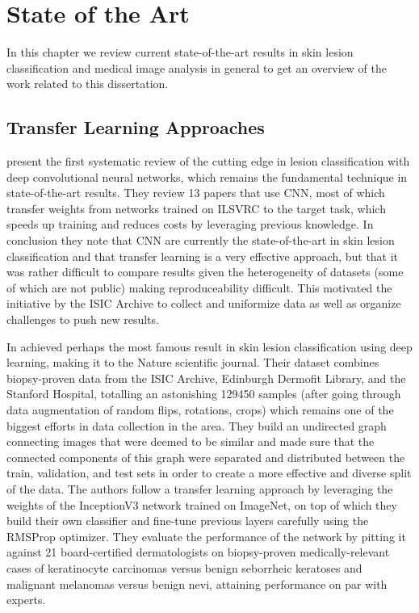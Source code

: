 \chapter{State of the Art}
\label{chapter:sota}

In this chapter we review current state-of-the-art results in skin lesion classification and medical image analysis in general to get an overview of the work related to this dissertation.

\section{Transfer Learning Approaches}

\citeauthor{Brinker2018} \cite{Brinker2018} present the first systematic review of the cutting edge in lesion classification with deep convolutional neural networks, which remains the fundamental technique in state-of-the-art results. They review 13 papers that use \ac{CNN}, most of which transfer weights from networks trained on \ac{ILSVRC} to the target task, which speeds up training and reduces costs by leveraging previous knowledge. In conclusion they note that \ac{CNN} are currently the state-of-the-art in skin lesion classification and that transfer learning is a very effective approach, but that it was rather difficult to compare results given the heterogeneity of datasets (some of which are not public) making reproduceability difficult. This motivated the initiative by the ISIC Archive to collect and uniformize data as well as organize challenges to push new results.

In \citeyear{nature2017} \citeauthor{nature2017} \cite{nature2017} achieved perhaps the most famous result in skin lesion classification using deep learning, making it to the Nature scientific journal. Their dataset combines biopsy-proven data from the ISIC Archive, Edinburgh Dermofit Library, and the Stanford Hospital, totalling an astonishing 129450 samples (after going through data augmentation of random flips, rotations, crops) which remains one of the biggest efforts in data collection in the area. They build an undirected graph connecting images that were deemed to be similar and made sure that the connected components of this graph were separated and distributed between the train, validation, and test sets in order to create a more effective and diverse split of the data. The authors follow a transfer learning approach by leveraging the weights of the InceptionV3 network trained on ImageNet, on top of which they build their own classifier and fine-tune previous layers carefully using the RMSProp optimizer. They evaluate the performance of the network by pitting it against 21 board-certified dermatologists on biopsy-proven medically-relevant cases of keratinocyte carcinomas versus benign seborrheic keratoses and malignant melanomas versus benign nevi, attaining performance on par with experts.

